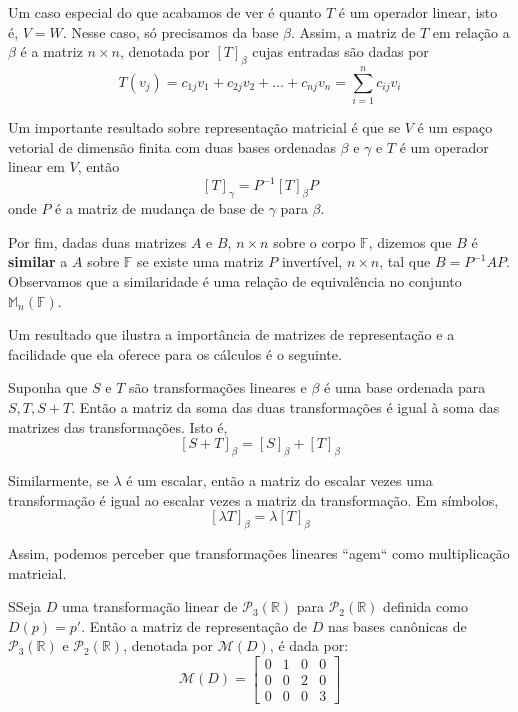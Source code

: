 \documentclass[12pt,a4paper]{article}
\begin{document}
Um caso especial do que acabamos de ver é quanto $T$ é um operador linear, isto é, $V = W$. Nesse caso, só precisamos da base $\beta$. Assim, a matriz de $T$ em relação a $\beta$ é a matriz $n \times n$, denotada por $[T]_\beta$ cujas entradas são dadas por
\[
T(v_j) = c_{1j} v_1 + c_{2j} v_2 + \ldots +  c_{nj} v_n = \sum_{i=1}^n c_{ij} v_i
\]

Um importante resultado sobre representação matricial é que se $V$ é um espaço vetorial de dimensão finita com duas bases ordenadas $\beta$ e $\gamma$ e $T$ é um operador linear em $V$, então
\[
[T]_{\gamma} = P^{-1}[T]_{\beta}P
\]
onde $P$ é a matriz de mudança de base de $\gamma$ para $\beta$.

Por fim, dadas duas matrizes $A$ e $B$, $n \times n$ sobre o corpo $\mathbb{F}$, dizemos que $B$ é \textbf{similar} a $A$ sobre $\mathbb{F}$ se existe uma matriz $P$ invertível, $n \times n$, tal que $B = P^{-1}AP$. Observamos que a similaridade é uma relação de equivalência no conjunto $\mathbb{M}_n(\mathbb{F})$.

Um resultado que ilustra a importância de matrizes de representação e a facilidade que ela oferece para os cálculos é o seguinte.

Suponha que $S$ e $T$ são transformações lineares e $\beta$ é uma base ordenada para $S, T, S+T$. Então a matriz da soma das duas transformações é igual à soma das matrizes das transformações. Isto é,
\[
[S+T]_{\beta} = [S]_{\beta} + [T]_{\beta}
\]

Similarmente, se $\lambda$ é um escalar, então a matriz do escalar vezes uma transformação é igual ao escalar vezes a matriz da transformação. Em símbolos,
\[
[\lambda T]_{\beta} = \lambda [T]_{\beta}
\]

Assim, podemos perceber que transformações lineares ``agem`` como multiplicação matricial.

\begin{exemplo}{}
 SSeja $D$ uma transformação linear de $\mathcal{P}_3 (\mathbb{R})$ para $\mathcal{P}_2 (\mathbb{R})$ definida como $D(p) = p'$. Então a matriz de representação de $D$ nas bases canônicas de $\mathcal{P}_3 (\mathbb{R})$ e $\mathcal{P}_2 (\mathbb{R})$, denotada por $\mathcal{M}(D)$, é dada por:
\[
\mathcal{M}(D) =
\begin{bmatrix}
0 & 1 & 0 & 0 \\
0 & 0 & 2 & 0 \\
0 & 0 & 0 & 3
\end{bmatrix}
\]

\end{exemplo}
\end{document}
